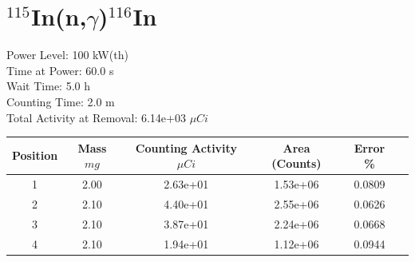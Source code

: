 \newpage

\section*{ $^{115}$In(n,$\gamma$)$^{116}$In }

Power Level: 100 kW(th) \\
Time at Power: 60.0 s \\
Wait Time:  5.0 h \\
Counting Time:  2.0 m \\
Total Activity at Removal: 6.14e+03 $\mu Ci$

\begin{table}[h]
\centering
\begin{tabular}{ |c|c|c|c|c|c| }
 \hline
 Position & Mass $mg$ & Counting Activity $\mu Ci$ & Area (Counts) & Error \% \\
 \hline 
 1 & 2.00 & 2.63e+01 & 1.53e+06 & 0.0809 \\ 
\hline
 2 & 2.10 & 4.40e+01 & 2.55e+06 & 0.0626 \\ 
\hline
 3 & 2.10 & 3.87e+01 & 2.24e+06 & 0.0668 \\ 
\hline
 4 & 2.10 & 1.94e+01 & 1.12e+06 & 0.0944 \\ 
\hline
\end{tabular}
\end{table}

